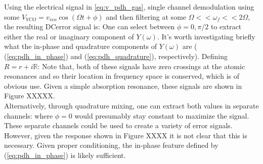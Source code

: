 Using the electrical signal in \ref{eq:v_pdh_gas}, single channel demodulation using some $V_{VCO} = v_{vco}\cos(\Omega t+ \phi)$ and then filtering at some $\Omega << \omega_f << 2\Omega$, the resulting DCerror signal is:
\ggather{
  \epsilon \propto \Re[Y(\omega)]\cos\phi + \Im[Y(\omega)]\sin\phi
}
One can select between $\phi = 0, \pi/2$ to extract either the real or imaginary component of $Y(\omega)$. It's worth investigating briefly what the in-phase and quadrature components of $Y(\omega)$ are ( (\ref{eq:pdh_in_phase}) and (\ref{eq:pdh_quadrature}), respectively). Defining $R = r + i\mathbb{R}$:
Note that, both of these signals have zero crossings at the atomic resonances and so their location in frequency space is conserved, which is of obvious use. Given a simple absorption resonance, these signals are shown in Figure XXXXX. \\

Alternatively, through quadrature mixing, one can extract both values in separate channels:
where $\phi=0$ would presumably stay constant to maximize the signal. These separate channels could be used to create a variety of error signals. However, given the response shown in Figure XXXX it is not clear that this is necessary. Given proper conditioning, the in-phase feature defined by (\ref{eq:pdh_in_phase}) is likely sufficient.
